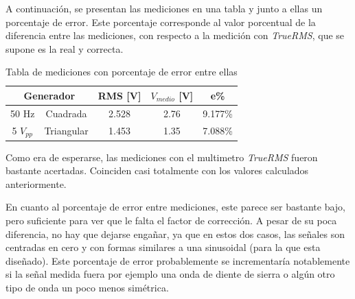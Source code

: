 
A continuación, se presentan las mediciones en una tabla y junto a ellas un porcentaje de error. Este porcentaje corresponde al valor porcentual de la diferencia entre las mediciones, con respecto a la medición con \textit{TrueRMS}, que se supone es la real y correcta. 

\begin{table}[H]
    \centering
    \begin{tabular}{|c|c|c|c|c|}
    \hline
        \multicolumn{2}{|c|}{Generador} & RMS [V] & $V_{medio}$ [V] & e\% \\
    \hline
        50 Hz & Cuadrada & 2.528 & 2.76 & 9.177\% \\
    \cline{2-5}
        5 $V_{pp}$ & Triangular & 1.453 & 1.35 & 7.088\% \\
    \hline
        \end{tabular}
        \def\tablename{Tabla} 
        \caption{Tabla de mediciones con porcentaje de error entre ellas}
        \label{tab:RMSvsVm}
\end{table}

Como era de esperarse, las mediciones con el multimetro \textit{TrueRMS} fueron bastante acertadas. Coinciden casi totalmente con los valores calculados anteriormente.

En cuanto al porcentaje de error entre mediciones, este parece ser bastante bajo, pero suficiente para ver que le falta el factor de corrección. A pesar de su poca diferencia, no hay que dejarse engañar, ya que en estos dos casos, las señales son centradas en cero y con formas similares a una sinusoidal (para la que esta diseñado). Este porcentaje de error probablemente se incrementaría notablemente si la señal medida fuera por ejemplo una onda de diente de sierra o algún otro tipo de onda un poco menos simétrica.

